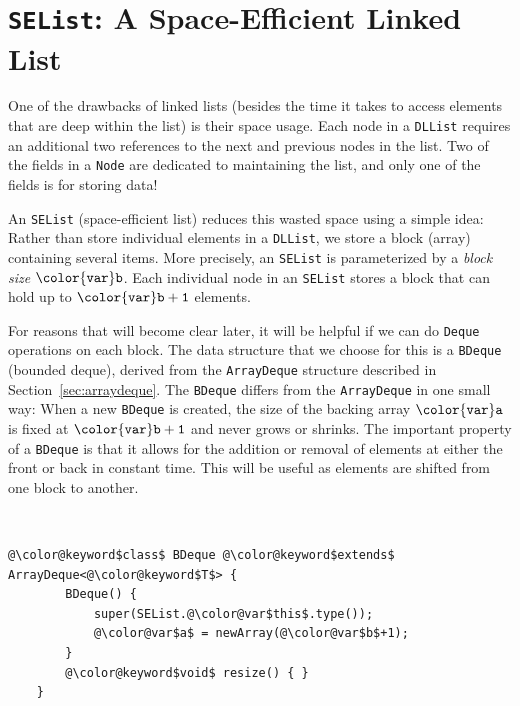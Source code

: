 \documentclass[10pt]{book}
\newcommand{\seclabel}[1]{\label{sec:#1}}
\newcommand{\secref}[1]{Section~\ref{sec:#1}}
\theoremstyle{plain}
\theoremstyle{definition}
\begin{document}
\section{\texttt{SEList}: A Space-Efficient Linked List}
\seclabel{selist}

%
%
One of the drawbacks of linked lists (besides the time it takes to access
elements that are deep within the list) is their space usage.  Each node
in a \texttt{DLList} requires an additional two references to the next and
previous nodes in the list.  Two of the fields in a \texttt{Node} are dedicated
to maintaining the list, and only one of the fields is for storing data!

An \texttt{SEList} (space-efficient list) reduces this wasted space using
a simple idea: Rather than store individual elements in a \texttt{DLList},
we store a block (array) containing several items. More precisely, an
\texttt{SEList} is parameterized by a \emph{block size} \ensuremath{\mathtt{{\color{var}b}}}. Each individual
node in an \texttt{SEList} stores a block that can hold up to \ensuremath{\mathtt{{\color{var}b}+1}} elements.

For reasons that will become clear later, it will be helpful if we can
do \texttt{Deque} operations on each block.  The data structure that we choose
for this is a \texttt{BDeque} (bounded deque),
%
%
%
derived from the \texttt{ArrayDeque}
structure described in \secref{arraydeque}.  The \texttt{BDeque} differs from the
\texttt{ArrayDeque} in one small way: When a new \texttt{BDeque} is created, the size
of the backing array \ensuremath{\mathtt{{\color{var}a}}} is fixed at \ensuremath{\mathtt{{\color{var}b}+1}} and never grows or shrinks.
The important property of a \texttt{BDeque} is that it allows for the addition
or removal of elements at either the front or back in constant time. This
will be useful as elements are shifted from one block to another.



 \ \vspace{.5ex}\begin{Verbatim}[gobble=1,tabsize=2,frame=single,framerule=1.2pt,commandchars=\\@\$,label=\texttt{SEList},labelposition=topline]
	@\color@keyword$class$ BDeque @\color@keyword$extends$ ArrayDeque<@\color@keyword$T$> {
		BDeque() {
			super(SEList.@\color@var$this$.type());
			@\color@var$a$ = newArray(@\color@var$b$+1);
		}
		@\color@keyword$void$ resize() { }
	}
\end{Verbatim}
\end{document}
